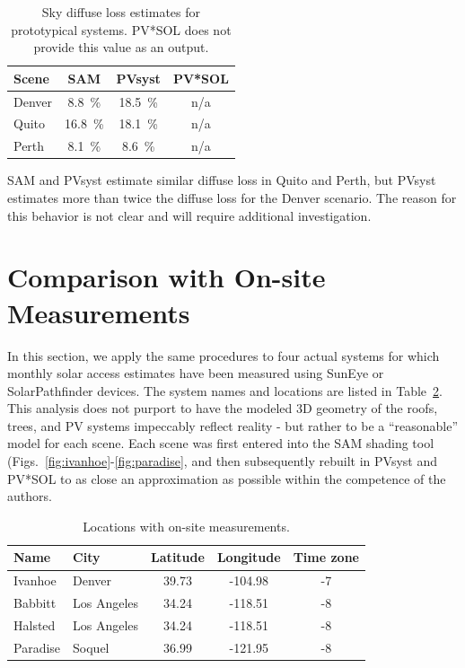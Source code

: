 \documentclass[twocolumn,10pt]{asme2ej}
\begin{document}
\begin{table}[h!]
\begin{center}
\begin{tabular}{lccc}
Scene & SAM & PVsyst & PV*SOL \\
\hline
Denver & 8.8~\% & 18.5~\% & n/a \\
Quito  & 16.8~\% & 18.1~\% & n/a \\
Perth  & 8.1~\% & 8.6~\% & n/a \\
\end{tabular}
\caption{Sky diffuse loss estimates for prototypical systems.  PV*SOL does not provide this value as an output.}
\label{tab:diffuse_loss}
\end{center}
\end{table}

SAM and PVsyst estimate similar diffuse loss in Quito and Perth, but PVsyst estimates more than twice the diffuse loss for the Denver scenario.  The reason for this behavior is not clear and will require additional investigation.


\section{Comparison with On-site Measurements}

In this section, we apply the same procedures to four actual systems for which monthly solar access estimates have been measured using SunEye or SolarPathfinder devices.  The system names and locations are listed in Table~\ref{tab:measured_system_names}.  This analysis does not purport to have the modeled 3D geometry of the roofs, trees, and PV systems impeccably reflect reality - but rather to be a ``reasonable'' model for each scene.  Each scene was first entered into the SAM shading tool (Figs.~\ref{fig:ivanhoe}-\ref{fig:paradise}, and then subsequently rebuilt in PVsyst and PV*SOL to as close an approximation as possible within the competence of the authors.

\begin{table}[h!]
\begin{center}
\begin{tabular}{llccc}
Name & City & Latitude & Longitude & Time zone \\
\hline
Ivanhoe & Denver & 39.73 & -104.98 & -7 \\
Babbitt & Los Angeles & 34.24 & -118.51 & -8 \\
Halsted & Los Angeles & 34.24 & -118.51 & -8 \\
Paradise & Soquel & 36.99 & -121.95 & -8 \\
\end{tabular}
\caption{Locations with on-site measurements.}
\label{tab:measured_system_names}
\end{center}
\end{table}
\end{document}
